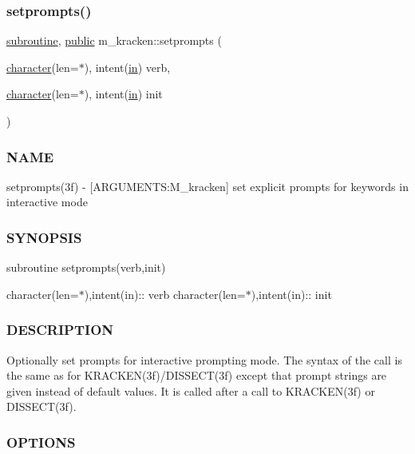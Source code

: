 \subsubsection{\texorpdfstring{setprompts()}{setprompts()}}
{\footnotesize\ttfamily \hyperlink{M__stopwatch_83_8txt_acfbcff50169d691ff02d4a123ed70482}{subroutine}, \hyperlink{M__stopwatch_83_8txt_a2f74811300c361e53b430611a7d1769f}{public} m\+\_\+kracken\+::setprompts (\begin{DoxyParamCaption}\item[{\hyperlink{option__stopwatch_83_8txt_abd4b21fbbd175834027b5224bfe97e66}{character}(len=$\ast$), intent(\hyperlink{M__journal_83_8txt_afce72651d1eed785a2132bee863b2f38}{in})}]{verb,  }\item[{\hyperlink{option__stopwatch_83_8txt_abd4b21fbbd175834027b5224bfe97e66}{character}(len=$\ast$), intent(\hyperlink{M__journal_83_8txt_afce72651d1eed785a2132bee863b2f38}{in})}]{init }\end{DoxyParamCaption})}



\subsubsection*{N\+A\+ME}

setprompts(3f) -\/ \mbox{[}A\+R\+G\+U\+M\+E\+N\+TS\+:M\+\_\+kracken\mbox{]} set explicit prompts for keywords in interactive mode \subsubsection*{S\+Y\+N\+O\+P\+S\+IS}

subroutine setprompts(verb,init)

character(len=$\ast$),intent(in)\+:\+: verb character(len=$\ast$),intent(in)\+:\+: init

\subsubsection*{D\+E\+S\+C\+R\+I\+P\+T\+I\+ON}

\begin{DoxyVerb}Optionally set prompts for interactive prompting mode.
The syntax of the call is the same as for KRACKEN(3f)/DISSECT(3f) except that prompt
strings are given instead of default values. It is called after a call to KRACKEN(3f)
or DISSECT(3f).
\end{DoxyVerb}


\subsubsection*{O\+P\+T\+I\+O\+NS}

